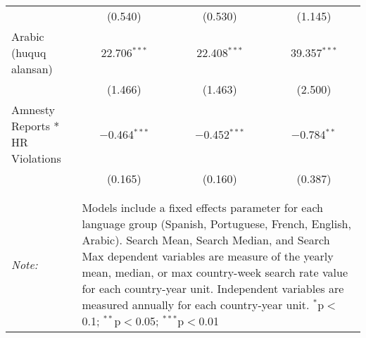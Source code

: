 \begin{table}[!htbp]
\begin{tabular}{@{\extracolsep{5pt}}lccc}
  & (0.540) & (0.530) & (1.145) \\ 
  Arabic (huquq alansan) & 22.706$^{***}$ & 22.408$^{***}$ & 39.357$^{***}$ \\ 
  & (1.466) & (1.463) & (2.500) \\ 
  Amnesty Reports * HR Violations & $-$0.464$^{***}$ & $-$0.452$^{***}$ & $-$0.784$^{**}$ \\ 
  & (0.165) & (0.160) & (0.387) \\ 
 \hline \\[-1.8ex] 
\hline 
\hline \\[-1.8ex] 
\textit{Note:}  & \multicolumn{3}{l}{\parbox[t]{8cm}{Models include a fixed effects parameter for each language group (Spanish, Portuguese, French, English, Arabic). Search Mean, Search Median, and Search Max dependent variables are measure of the yearly mean, median, or max country-week search rate value for each country-year unit. Independent variables are measured annually for each country-year unit. $^{*}$p$<$0.1; $^{**}$p$<$0.05; $^{***}$p$<$0.01}} \\ 
\end{tabular} 
\end{table} 
